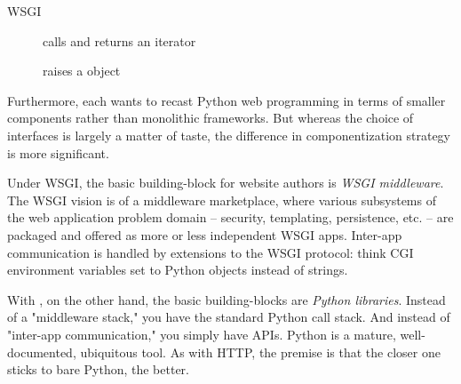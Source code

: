 \begin{description}

\item[WSGI]
    { calls  and returns
    an iterator}

\item[]
    { raises a  object}

\end{description}


Furthermore, each wants to recast Python web programming in terms of smaller
components rather than monolithic frameworks. But whereas the choice of
interfaces is largely a matter of taste, the difference in componentization
strategy is more significant.

Under WSGI, the basic building-block for website authors is \emph{WSGI
middleware}. The WSGI vision is of a middleware marketplace, where various
subsystems of the web application problem domain -- security, templating,
persistence, etc. -- are packaged and offered as more or less independent WSGI
apps. Inter-app communication is handled by extensions to the WSGI protocol:
think CGI environment variables set to Python objects instead of strings.

With , on the other hand, the basic building-blocks are
\emph{Python libraries}. Instead of a "middleware stack," you have the standard
Python call stack. And instead of "inter-app communication," you simply have
APIs. Python is a mature, well-documented, ubiquitous tool. As with HTTP, the
premise is that the closer one sticks to bare Python, the better.
